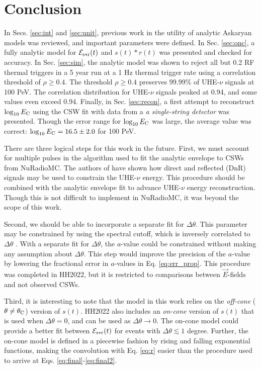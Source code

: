 \documentclass[amsmath,amssymb,aps,prd,10pt,twocolumn,showkeys]{revtex4}
\begin{document}
\section{Conclusion}
\label{sec:conc}

In Secs. \ref{sec:int} and \ref{sec:unit}, previous work in the utility of analytic Askaryan models was reviewed, and important parameters were defined.  In Sec. \ref{sec:onc}, a fully analytic model for $\mathcal{E}_{\rm s*r}(t)$ and $s(t) * r(t)$ was presented and checked for accuracy.  In Sec. \ref{sec:sim}, the analytic model was shown to reject all but 0.2 RF thermal triggers in a 5 year run at a 1 Hz thermal trigger rate using a correlation threshold of $\rho\geq 0.4$.  The threshold $\rho\geq 0.4$ preserves 99.99\% of UHE-$\nu$ signals at 100 PeV.  The correlation distribution for UHE-$\nu$ signals peaked at 0.94, and some values even exceed 0.94.  Finally, in Sec. \ref{sec:recon}, a first attempt to reconstruct $\log_{10}E_{\rm C}$ using the CSW fit with data from a \textit{a single-string detector} was presented.  Though the error range for $\log_{10}E_{\rm C}$ was large, the average value was correct: $\log_{10}E_{\rm C} = 16.5 \pm 2.0$ for 100 PeV.

There are three logical steps for this work in the future.  First, we must account for multiple pulses in the algorithm used to fit the analytic envelope to CSWs from NuRadioMC.  The authors of \cite{anker2019neutrino-734} have shown how direct and reflected (DnR) signals may be used to constrain the UHE-$\nu$ energy.  This procedure should be combined with the analytic envelope fit to advance UHE-$\nu$ energy reconstruction.  Though this is not difficult to implement in NuRadioMC, it was beyond the scope of this work.

Second, we should be able to incorporate a separate fit for $\Delta\theta$.  This parameter may be constrained by using the spectral cutoff, which is inversely correlated to $\Delta\theta$ \cite{10.1016/j.astropartphys.2017.03.008}.  With a separate fit for $\Delta\theta$, the $a$-value could be constrained without making any assumption about $\Delta\theta$.  This step would improve the precision of the $a$-value by lowering the fractional error in $a$-values in Eq. \ref{eq:err_prop}.  This procedure was completed in HH2022, but it is restricted to comparisons between $\vec{E}$-fields and not observed CSWs.

Third, it is interesting to note that the model in this work relies on the \textit{off-cone} ($\theta \neq \theta_{\rm C}$) version of $s(t)$.  HH2022 also includes an \textit{on-cone} version of $s(t)$ that is used when $\Delta\theta = 0$, and can be used as $\Delta\theta\to 0$.  The on-cone model could provide a better fit between $\mathcal{E}_{\rm s*r}(t)$ for events with $\Delta\theta \lesssim 1$ degree.  Further, the on-cone model is defined in a piecewise fashion by rising and falling exponential functions, making the convolution with Eq. \ref{eq:r} easier than the procedure used to arrive at Eqs. \ref{eq:final}-\ref{eq:final2}.
\end{document}
